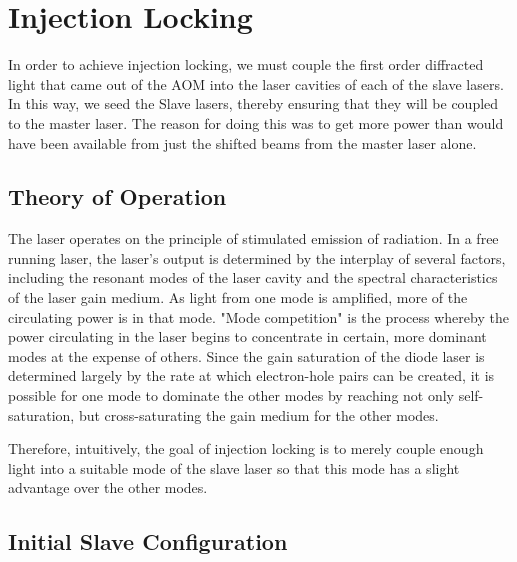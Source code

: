  \chapter{Injection Locking}\label{InjectionLockingChapter}


In order to achieve injection locking, we must couple the first order diffracted light that came out of the AOM into the laser cavities of each of the slave lasers. In this way, we seed the Slave lasers, thereby ensuring that they will be coupled to the master laser. 
The reason for doing this was to get more power than would have been available from just the shifted beams from the master laser alone. 

\section{Theory of Operation}


The laser operates on the principle of stimulated emission of radiation. In a free running laser, the laser's output is determined by the interplay of several factors, including the resonant modes of the laser cavity and the spectral characteristics of the laser gain medium. As light from one mode is amplified, more of the circulating power is in that mode. 
"Mode competition" is the process whereby the power circulating in the laser begins to concentrate in certain, more dominant modes at the expense of others. Since the gain saturation of the diode laser is determined largely by the rate at which electron-hole pairs can be created, it is possible for one mode to dominate the other modes by reaching not only self-saturation, but cross-saturating the gain medium for the other modes\cite{RPPhotonicsEncyclopediaAndBuyersGuide}.

Therefore, intuitively, the goal of injection locking is to merely couple enough light into a suitable mode of the slave laser so that this mode has a slight advantage over the other modes. 

\section{Initial Slave Configuration}


